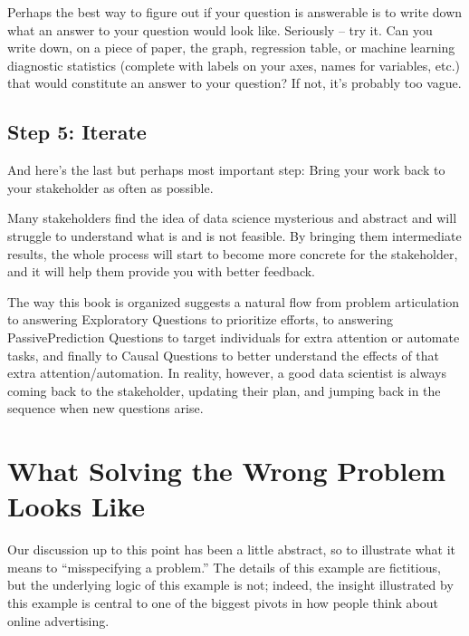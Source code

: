 \documentclass[letterpaper,10pt,english]{jupyterBook}
\begin{document}
\sphinxAtStartPar
Perhaps the best way to figure out if your question is answerable is to write down what an answer to your question would look like. Seriously – try it. Can you write down, on a piece of paper, the graph, regression table, or machine learning diagnostic statistics (complete with labels on your axes, names for variables, etc.) that would constitute an answer to your question? If not, it’s probably too vague.


\subsection{Step 5: Iterate}
\label{\detokenize{10_introduction/30_solving_the_right_problem:step-5-iterate}}
\sphinxAtStartPar
And here’s the last but perhaps most important step:  Bring your work back to your stakeholder as often as possible.

\sphinxAtStartPar
Many stakeholders find the idea of data science mysterious and abstract and will struggle to understand what is and is not feasible. By bringing them intermediate results, the whole process will start to become more concrete for the stakeholder, and it will help them provide you with better feedback.

\sphinxAtStartPar
The way this book is organized suggests a natural flow from problem articulation to answering Exploratory Questions to prioritize efforts, to answering Passive\sphinxhyphen{}Prediction Questions to target individuals for extra attention or automate tasks, and finally to Causal Questions to better understand the effects of that extra attention/automation. In reality, however, a good data scientist is always coming back to the stakeholder, updating their plan, and jumping back in the sequence when new questions arise.


\section{What Solving the Wrong Problem Looks Like}
\label{\detokenize{10_introduction/30_solving_the_right_problem:what-solving-the-wrong-problem-looks-like}}
\sphinxAtStartPar
Our discussion up to this point has been a little abstract, so to illustrate what it means to “mis\sphinxhyphen{}specifying a problem.” The details of this example are fictitious, but the underlying logic of this example is not; indeed, the insight illustrated by this example is central to one of the biggest pivots in how people think about online advertising.
\end{document}
